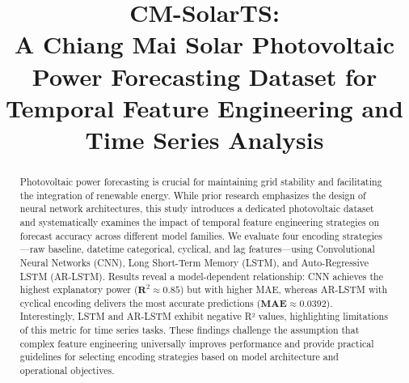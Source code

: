 \documentclass[conference]{IEEEtran}
\begin{document}
	
	\title{CM-SolarTS:\\ A Chiang Mai Solar Photovoltaic Power Forecasting Dataset for Temporal Feature Engineering and Time Series Analysis \\
	}
	
	\author{
		
		\and
	}
	
	\maketitle
	
	\begin{abstract}
		Photovoltaic power forecasting is crucial for maintaining grid stability and facilitating the integration of renewable energy. While prior research emphasizes the design of neural network architectures, this study introduces a dedicated photovoltaic dataset and systematically examines the impact of temporal feature engineering strategies on forecast accuracy across different model families. We evaluate four encoding strategies—raw baseline, datetime categorical, cyclical, and lag features—using Convolutional Neural Networks (CNN), Long Short-Term Memory (LSTM), and Auto-Regressive LSTM (AR-LSTM). Results reveal a model-dependent relationship: CNN achieves the highest explanatory power ($\mathbf{R}^{2} \approx 0.85$) but with higher MAE, whereas AR-LSTM with cyclical encoding delivers the most accurate predictions ($\mathbf{MAE} \approx 0.0392$). Interestingly, LSTM and AR-LSTM exhibit negative R² values, highlighting limitations of this metric for time series tasks. These findings challenge the assumption that complex feature engineering universally improves performance and provide practical guidelines for selecting encoding strategies based on model architecture and operational objectives.
	\end{abstract}
	
\end{document}
